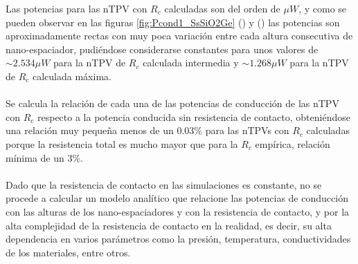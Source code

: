 Las potencias para las nTPV con $R_c$ calculadas son del orden de $\mu W$, y como se pueden observar en las figuras \ref{fig:Pcond1_SsSiO2Ge} () y () las potencias son aproximadamente rectas con muy poca variación entre cada altura consecutiva de nano-espaciador, pudiéndose considerarse constantes para unos valores de $\sim 2.534 \mu W$ para la nTPV de $R_c$ calculada intermedia y $\sim 1.268 \mu W$ para la nTPV de $R_c$ calculada máxima.\\\\
Se calcula la relación de cada una de las potencias de conducción de las nTPV con $R_c$ respecto a la potencia conducida sin resistencia de contacto, obteniéndose una relación muy pequeña menos de un 0.03\% para las nTPVs con $R_c$ calculadas porque la resistencia total es mucho mayor que para la $R_c$ empírica, relación mínima de un 3\%.\\\\
Dado que la resistencia de contacto en las simulaciones es constante, no se procede a calcular un modelo analítico que relacione las potencias de conducción con las alturas de los nano-espaciadores y con la resistencia de contacto, y por la alta complejidad de la resistencia de contacto en la realidad, es decir, su alta dependencia en varios parámetros como la presión, temperatura, conductividades de los materiales, entre otros.
